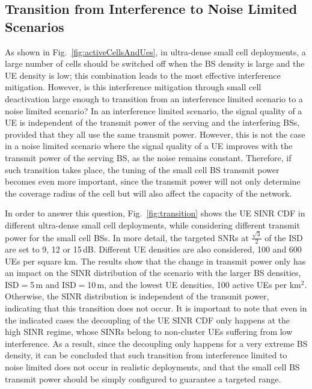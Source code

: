 \documentclass{IEEEtran}
\begin{document}
\subsection{Transition from Interference to Noise Limited Scenarios}

As shown in Fig.~\ref{fig:activeCellsAndUes},
in ultra-dense small cell deployments,
a large number of cells should be switched off
when the \ac{BS} density is large and the \ac{UE} density is low;
this combination leads to the most effective interference mitigation.
However, is this interference mitigation through small cell deactivation large enough
to transition from an interference limited scenario to a noise limited scenario?
In an interference limited scenario,
the signal quality of a \ac{UE} is independent of the transmit power of the serving and the interfering \acp{BS},
provided that they all use the same transmit power.
However, this is not the case in a noise limited scenario
where the signal quality of a \ac{UE} improves with the transmit power of the serving \ac{BS},
as the noise remains constant.
Therefore, if such transition takes place,
the tuning of the small cell \ac{BS} transmit power becomes even more important,
since the transmit power will not only determine the coverage radius of the cell but will also affect the capacity of the network.

In order to answer this question,
Fig.~\ref{fig:transition} shows the \ac{UE} \ac{SINR} \ac{CDF} in different ultra-dense small cell deployments,
while considering different transmit power for the small cell \acp{BS}.
In more detail, the targeted \acp{SNR} at $\frac{\sqrt{3}}{2}$ of the \ac{ISD} are set to 9, 12 or 15\,dB.
Different  \ac{UE} densities are also considered, 100 and 600 UEs per square km.
The results show that
the change in transmit power only has an impact on the \ac{SINR} distribution of the scenario with the larger \ac{BS} densities, ISD$=$5\,m and ISD$=$10\,m,
and the lowest \ac{UE} densities, 100 active \acp{UE} per km$^2$.
Otherwise, the \ac{SINR} distribution is independent of the transmit power,
indicating that this transition does not occur.
It is important to note that even in the indicated cases
the decoupling of the \ac{UE} \ac{SINR} \ac{CDF} only happens at the high \ac{SINR} regime,
whose \acp{SINR} belong to non-cluster \acp{UE} suffering from low interference.
As a result,
since the decoupling only happens for a very extreme \ac{BS} density,
it can be concluded that such transition from interference limited to noise limited does not occur in realistic deployments,
and that the small cell \ac{BS} transmit power should be simply configured to guarantee a targeted range.
\end{document}
